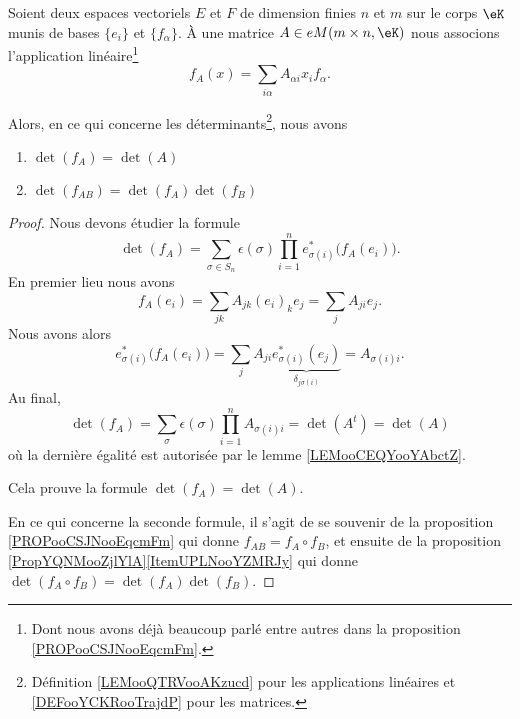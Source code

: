 \begin{proposition}     \label{PROPooFKDXooKMSolt}
    Soient deux espaces vectoriels \( E\) et \( F\) de dimension finies \( n\) et \( m\) sur le corps \( \eK\) munis de bases \( \{e_i\}\) et \( \{f_{\alpha}\}\). À une matrice \( A\in \\eM(m\times n,\eK)\) nous associons l'application linéaire\footnote{Dont nous avons déjà beaucoup parlé entre autres dans la proposition \ref{PROPooCSJNooEqcmFm}.}
    \begin{equation}
        f_A(x)=\sum_{i\alpha}A_{\alpha i}x_if_{\alpha}.
    \end{equation}
    
    Alors, en ce qui concerne les déterminants\footnote{Définition \ref{LEMooQTRVooAKzucd} pour les applications linéaires et \ref{DEFooYCKRooTrajdP} pour les matrices.}, nous avons
    \begin{enumerate}
        \item
            \( \det(f_A)=\det(A)\)
        \item
            \( \det(f_{AB})=\det(f_A)\det(f_B)\)
    \end{enumerate}
\end{proposition}

\begin{proof}
    Nous devons étudier la formule
    \begin{equation}
        \det(f_A)=\sum_{\sigma\in S_n}\epsilon(\sigma)\prod_{i=1}^ne_{\sigma(i)}^*\big( f_A(e_i) \big).
    \end{equation}
    En premier lieu nous avons
    \begin{equation}
        f_A(e_i)=\sum_{jk}A_{jk}(e_i)_ke_j=\sum_jA_{ji}e_j.
    \end{equation}
    Nous avons alors
    \begin{equation}
        e_{\sigma(i)}^*\big( f_A(e_i) \big)=\sum_jA_{ji}\underbrace{e^*_{\sigma(i)}(e_j)}_{\delta_{j\sigma(i)}}=A_{\sigma(i)i}.
    \end{equation}
    Au final,
    \begin{equation}
        \det(f_A)=\sum_{\sigma}\epsilon(\sigma)\prod_{i=1}^nA_{\sigma(i)i}=\det(A^t)=\det(A)
    \end{equation}
    où la dernière égalité est autorisée par le lemme \ref{LEMooCEQYooYAbctZ}.

    Cela prouve la formule \( \det(f_A)=\det(A)\).

    En ce qui concerne la seconde formule, il s'agit de se souvenir de la proposition \ref{PROPooCSJNooEqcmFm} qui donne \( f_{AB}=f_A\circ f_B\), et ensuite de la proposition \ref{PropYQNMooZjlYlA}\ref{ItemUPLNooYZMRJy} qui donne \( \det(f_A\circ f_B)=\det(f_A)\det(f_B)\).
\end{proof}

